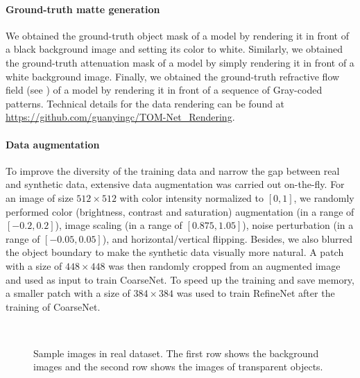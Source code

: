 \paragraph{Ground-truth matte generation}
\label{par:Ground Truth Generation}
We obtained the ground-truth object mask of a model by rendering it in front of a black background image and setting its color to white. Similarly, we obtained the ground-truth attenuation mask of a model by simply rendering it in front of a white background image. Finally, we obtained the ground-truth refractive flow field (see ) of a model by rendering it in front of a sequence of Gray-coded patterns. Technical details for the data rendering can be found at \url{https://github.com/guanyingc/TOM-Net_Rendering}.


\paragraph{Data augmentation}
To improve the diversity of the training data and narrow the gap between real and synthetic data, extensive data augmentation was carried out on-the-fly. 
For an image of size $512\times 512$ with color intensity normalized to $[0, 1]$, we randomly performed color (brightness, contrast and saturation) augmentation (in a range of $[-0.2, 0.2]$), image scaling (in a range of $[0.875, 1.05]$), noise perturbation (in a range of $[-0.05, 0.05]$), and horizontal/vertical flipping. Besides, we also blurred the object boundary to make the synthetic data visually more natural. A patch with a size of $448\times 448$ was then randomly cropped from an augmented image and used as input to train CoarseNet. To speed up the training and save memory, a smaller patch with a size of $384\times 384$ was used to train RefineNet after the training of CoarseNet.

\begin{figure}[t] \centering
    \\
    
    \caption[Sample images in real dataset]{Sample images in real dataset. The first row shows the background images and the second row shows the images of transparent objects.} \label{fig:real_sample}
\end{figure}

